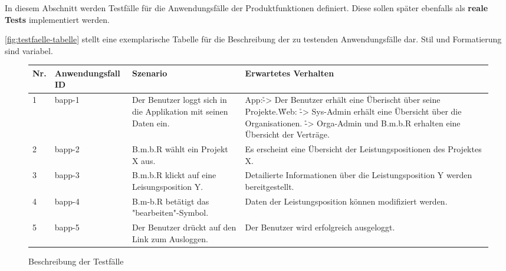 \begin{tcolorbox}
In diesem Abschnitt werden Testfälle für die Anwendungsfälle der Produktfunktionen definiert.
Diese sollen später ebenfalls als \textbf{reale Tests} implementiert werden.

\autoref{fig:testfaelle-tabelle} stellt eine exemplarische Tabelle für die Beschreibung der zu testenden Anwendungsfälle dar. 
Stil und Formatierung sind variabel.
\end{tcolorbox}

\begin{figure}[!h]
	\begin{center}
		\begin{tabularx}{\textwidth}{ p{} | p{} | p{} | X }
			\textbf{Nr.} & \textbf{Anwendungsfall ID} & \textbf{Szenario} & \textbf{Erwartetes Verhalten} \\ \hline
			1 & bapp-1 & Der Benutzer loggt sich in die Applikation mit seinen Daten ein. & App:\r -> Der Benutzer erhält eine Überischt über seine Projekte.\r Web: \r -> Sys-Admin erhält eine Übersicht über die Organisationen. \r -> Orga-Admin und B.m.b.R erhalten eine Übersicht der Verträge. \\ \hline
			2 & bapp-2 & B.m.b.R wählt ein Projekt X aus. & Es erscheint eine Übersicht der Leistungspositionen des Projektes X. \\ \hline
			3 & bapp-3 & B.m.b.R klickt auf eine Leisungsposition Y. & Detailierte Informationen über die Leistungsposition Y werden bereitgestellt. \\ \hline
			4 & bapp-4 & B.m-b.R betätigt das "bearbeiten"-Symbol. & Daten der Leistungsposition können modifiziert werden. \\ \hline
			5 & bapp-5 & Der Benutzer drückt auf den Link zum Ausloggen. & Der Benutzer wird erfolgreich ausgeloggt. \\ \hline
		\end{tabularx}	
	\end{center}
	\caption{Beschreibung der Testfälle}
	\label{fig:testfaelle-beide-anwendungen-tabelle}
\end{figure}

